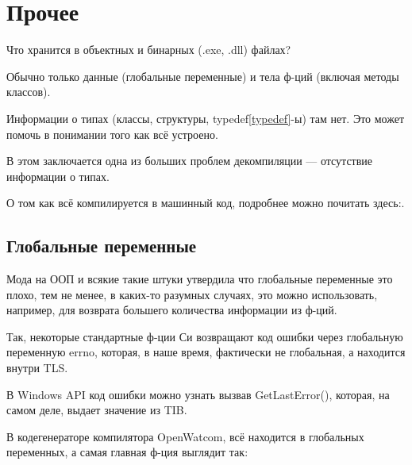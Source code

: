 ﻿\chapter{Прочее}

Что хранится в объектных и бинарных (.exe, .dll) файлах?

Обычно только данные (глобальные переменные) и тела ф-ций (включая методы классов).

Информации о типах (классы, структуры, typedef\ref{typedef}-ы) там нет. 
Это может помочь в понимании того как всё устроено.

В этом заключается одна из больших проблем декомпиляции --- отсутствие информации о типах.

О том как всё компилируется в машинный код, подробнее можно почитать здесь:\cite{REBook}.

\section{Глобальные переменные}

Мода на ООП и всякие такие штуки утвердила что глобальные переменные это плохо, тем не менее, в каких-то разумных
случаях, это можно использовать, например, для возврата большего количества информации из ф-ций. 

Так, некоторые стандартные ф-ции Си возвращают код ошибки через глобальную переменную errno, которая, в наше
время, фактически не глобальная, а находится внутри \ac{TLS}.

В Windows API код ошибки можно узнать вызвав GetLastError(), 
которая, на самом деле, выдает значение из \ac{TIB}.

В кодегенераторе компилятора OpenWatcom, всё находится в глобальных переменных,
а самая главная ф-ция выглядит так:

